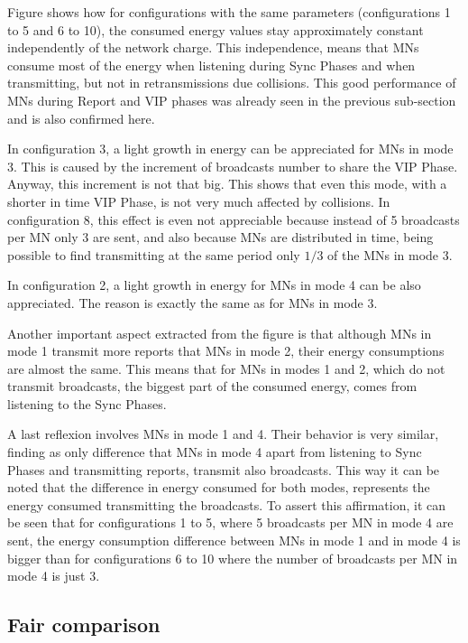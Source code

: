 Figure shows how for configurations with the same parameters (configurations 1 to 5 and 6 to 10), the consumed energy values stay approximately
constant independently of the network charge. This independence, means that \acp{MN} consume most of the energy when listening during Sync Phases and 
when transmitting, but not in retransmissions due collisions. This good performance of \acp{MN} during Report and \ac{VIP} phases was already seen
in the previous sub-section and is also confirmed here. 

In configuration 3, a light growth in energy can be appreciated for \acp{MN} in mode 3. This is caused by the increment of broadcasts number to share the 
\ac{VIP} Phase. Anyway, this increment is not that big. This shows that even this mode, with a shorter in time \ac{VIP} Phase, is not very much affected
by collisions. In configuration 8, this effect is even not appreciable because instead of 5 broadcasts per \ac{MN} only 3 are sent, and also because
\acp{MN} are distributed in time, being possible to find transmitting at the same period only $1/3$ of the \acp{MN} in mode 3.

In configuration 2, a light growth in energy for \acp{MN} in mode 4 can be also appreciated. The reason is exactly the same as for \acp{MN} in mode 3.

Another important aspect extracted from the figure is that although \acp{MN} in mode 1 transmit more reports that \acp{MN} in mode 2, their energy
consumptions are almost the same. This means that for \acp{MN} in modes 1 and 2, which do not transmit broadcasts, the biggest part of the consumed energy,
comes from listening to the Sync Phases.

A last reflexion involves \acp{MN} in mode 1 and 4. Their behavior is very similar, finding as only difference that \acp{MN} in mode 4 apart from 
listening to Sync Phases and transmitting reports, transmit also broadcasts. This way it can be noted that the difference in energy consumed for both
modes, represents the energy consumed transmitting the broadcasts. To assert this affirmation, it can be seen that for configurations 1 to 5, where
5 broadcasts per \ac{MN} in mode 4 are sent, the energy consumption difference between \acp{MN} in mode 1 and in mode 4 is bigger than for configurations
6 to 10 where the number of broadcasts per \ac{MN} in mode 4 is just 3.

\subsection{Fair comparison}

